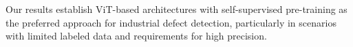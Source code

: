 \documentclass[journal,twoside,web]{ieeecolor}
\begin{document}
Our results establish ViT-based architectures with self-supervised pre-training as the preferred approach for industrial defect detection, particularly in scenarios with limited labeled data and requirements for high precision.


\end{document}
